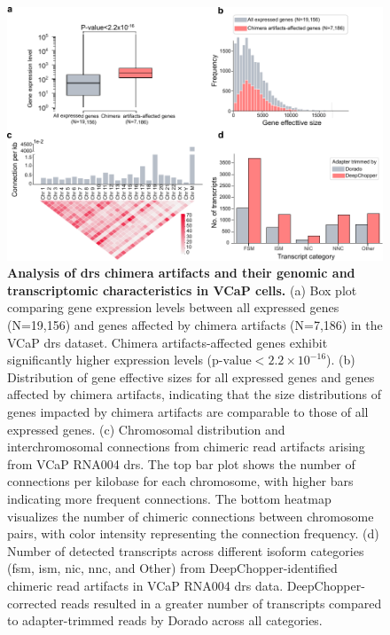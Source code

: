 \documentclass[pdflatex,sn-nature, lineno]{sn-jnl}%
\begin{document}
\begin{figure}[!ht]
	\includegraphics[height=0.65\columnwidth]{finals/sf2}
	\caption{ {\bf Analysis of \gls{drs} chimera artifacts and their genomic and transcriptomic characteristics in VCaP cells.} (a) Box plot comparing gene expression levels between all expressed genes (N=19,156) and genes affected by chimera artifacts (N=7,186) in the VCaP \gls{drs} dataset. Chimera artifacts-affected genes exhibit significantly higher expression levels (\(\textrm{p-value} < 2.2 \times 10^{-16}\)). (b) Distribution of gene effective sizes for all expressed genes and genes affected by chimera artifacts, indicating that the size distributions of genes impacted by chimera artifacts are comparable to those of all expressed genes. (c) Chromosomal distribution and interchromosomal connections from chimeric read artifacts arising from VCaP RNA004 \gls{drs}. The top bar plot shows the number of connections per kilobase for each chromosome, with higher bars indicating more frequent connections. The bottom heatmap visualizes the number of chimeric connections between chromosome pairs, with color intensity representing the connection frequency. (d) Number of detected transcripts across different isoform categories (\gls{fsm}, \gls{ism},  \gls{nic}, \gls{nnc}, and Other) from DeepChopper-identified chimeric read artifacts in VCaP RNA004 \gls{drs} data. DeepChopper-corrected reads resulted in a greater number of transcripts compared to adapter-trimmed reads by Dorado across all categories.}\label{fig:sf2}
\end{figure}



\end{document}
